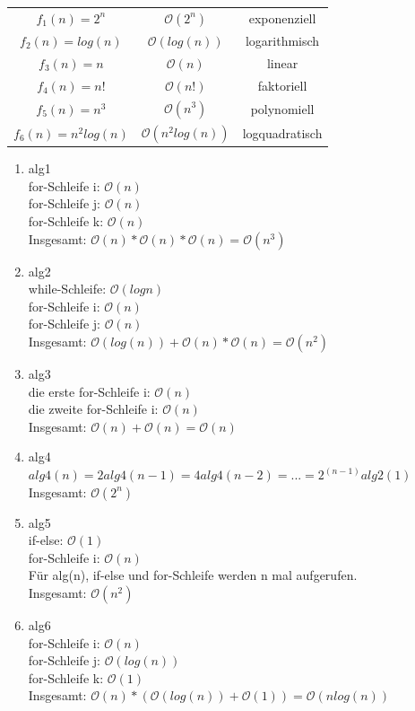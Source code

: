 \documentclass[12pt]{scrartcl}
\begin{document}
\begin{enumerate}
  \begin{center}
    \begin{tabular}{ |c|c|c| } 
     \hline
     $f_1(n) = 2^n$ & $\mathcal{O}(2^n)$ & exponenziell \\ 
     $f_2(n) = log(n)$ & $\mathcal{O}(log(n))$ & logarithmisch \\ 
     $f_3(n) = n$ & $\mathcal{O}(n)$ & linear \\ 
     $f_4(n) = n!$ & $\mathcal{O}(n!)$ & faktoriell \\ 
     $f_5(n) = n^3$ & $\mathcal{O}(n^3)$ & polynomiell \\ 
     $f_6(n) = n^2log(n)$ & $\mathcal{O}(n^2log(n))$ & logquadratisch \\ 
     \hline
    \end{tabular}
    \end{center}
\end{enumerate}

\begin{enumerate}
  \item alg1\\
    for-Schleife i: $\mathcal{O}(n)$\\
    for-Schleife j: $\mathcal{O}(n)$\\
    for-Schleife k: $\mathcal{O}(n)$\\
    Insgesamt: $\mathcal{O}(n)*\mathcal{O}(n)*\mathcal{O}(n) = \mathcal{O}(n^3)$
    \item alg2\\
    while-Schleife: $\mathcal{O}(log{}n)$\\
    for-Schleife i: $\mathcal{O}(n)$\\
    for-Schleife j: $\mathcal{O}(n)$\\
    Insgesamt: $\mathcal{O}(log(n)) + \mathcal{O}(n)*\mathcal{O}(n) = \mathcal{O}(n^2)$
    \item alg3\\
    die erste for-Schleife i: $\mathcal{O}(n)$\\
    die zweite for-Schleife i: $\mathcal{O}(n)$\\
    Insgesamt: $\mathcal{O}(n) + \mathcal{O}(n) = \mathcal{O}(n)$
    \item alg4\\
    $alg4(n) = 2alg4(n-1) = 4alg4(n-2) = ... = 2^{(n-1)}alg2(1)$\\
    Insgesamt: $\mathcal{O}(2^n)$
    \item alg5\\
    if-else: $\mathcal{O}(1)$\\
    for-Schleife i: $\mathcal{O}(n)$\\
    Für alg(n), if-else und for-Schleife werden n mal aufgerufen.\\
    Insgesamt: $\mathcal{O}(n^2)$
    \item alg6\\
    for-Schleife i: $\mathcal{O}(n)$\\
    for-Schleife j: $\mathcal{O}(log(n))$\\
    for-Schleife k: $\mathcal{O}(1)$\\
    Insgesamt: $\mathcal{O}(n)*(\mathcal{O}(log(n)) + \mathcal{O}(1)) = \mathcal{O}(nlog(n))$
\end{enumerate}
\end{document}
